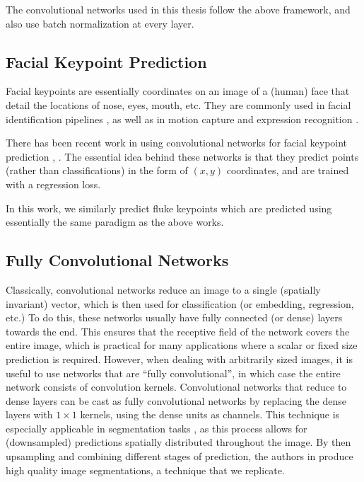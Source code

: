 The convolutional networks used in this thesis follow the above framework, and also use batch normalization \cite{ioffe2015batch} at every layer.

\subsection{Facial Keypoint Prediction}

Facial keypoints are essentially coordinates on an image of a (human) face that detail the locations of nose, eyes, mouth, etc.
They are commonly used in facial identification pipelines \cite{taigman2014deepface}, as well as in motion capture \cite{akagi2013facial} and expression recognition \cite{berretti20113d}.

There has been recent work in using convolutional networks for facial keypoint prediction \cite{sun2013deep}, \cite{nouri2014using}. 
The essential idea behind these networks is that they predict points (rather than classifications) in the form of $(x, y)$ coordinates, and are trained with a regression loss.

In this work, we similarly predict fluke keypoints which are predicted using essentially the same paradigm as the above works.

\subsection{Fully Convolutional Networks}

Classically, convolutional networks reduce an image to a single (spatially invariant) vector, which is then used for classification (or embedding, regression, etc.)
To do this, these networks usually have fully connected (or dense) layers towards the end.
This ensures that the receptive field of the network covers the entire image, which is practical for many applications where a scalar or fixed size prediction is required. 
However, when dealing with arbitrarily sized images, it is useful to use networks that are ``fully convolutional'', in which case the entire network consists of convolution kernels. 
Convolutional networks that reduce to dense layers can be cast as fully convolutional networks by replacing the dense layers with $1\times1$ kernels, using the dense units as channels.
This technique is especially applicable in segmentation tasks \cite{ning2005toward}, as this process allows for (downsampled) predictions spatially distributed throughout the image. %
By then upsampling and combining different stages of prediction, the authors in \cite{long2015fully} produce high quality image segmentations, a technique that we replicate.

